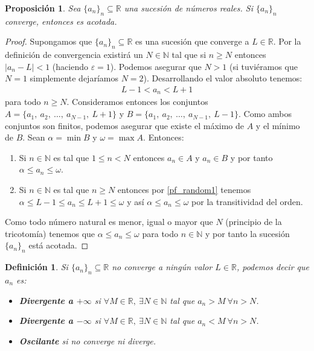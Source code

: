 \documentclass{article}
\newtheorem{prop}{Proposición}
\newtheorem{define}{Definición}
\newcommand{\reales}{\mathbb{R}}
\newcommand{\naturales}{\mathbb{N}}
\newcommand{\sucesion}[1]{\{ #1 _n \}_n}
\newcommand{\sucreal}[1]{\{ #1 _n \}_n \subseteq \reales}
\begin{document}
\begin{prop}
	Sea $\{ a_n\}_n \subseteq \mathbb{R}$ una sucesión de números reales. Si $\{ a_n\}_n$ converge, entonces es acotada.
\end{prop}

\begin{proof}
	Supongamos que $\sucreal{a}$ es una sucesión que converge a $L \in \reales$. Por la definición de convergencia existirá un $N \in \naturales$ tal que si $n \geq N$ entonces $|a_n - L| < 1$ (haciendo $\varepsilon = 1$). Podemos asegurar que $N > 1$ (si tuviéramos que $N = 1$ simplemente dejaríamos $N = 2$). Desarrollando el valor absoluto tenemos:
	\begin{align}\label{pf_random1}
		L - 1 < a_n < L + 1
	\end{align}	
	para todo $n \geq N$. Consideramos entonces los conjuntos $A = \{ a_1,\ a_2,\ \ldots,\ a_{N-1},\  L+1\}$ y $B = \{ a_1,\ a_2,\ \ldots,\ a_{N-1},\ L-1\}$. Como ambos conjuntos son finitos, podemos asegurar que existe el máximo de $A$ y el mínimo de $B$. Sean $\alpha = \min B$ y $\omega = \max A$. Entonces:
	\begin{enumerate}
	\item
	Si $n \in \naturales$ es tal que $1 \leq n < N$ entonces $a_n \in A$ y $a_n \in B$ y por tanto $\alpha \leq a_n \leq \omega$.
	\item
	Si $n \in \naturales$ es tal que $n \geq N$ entonces por \eqref{pf_random1} tenemos $\alpha \leq L - 1 \leq a_n \leq L + 1 \leq \omega$ y así $\alpha \leq a_n \leq \omega$ por la transitividad del orden.
	\end{enumerate}	 
	Como todo número natural es menor, igual o mayor que $N$ (principio de la tricotomía) tenemos que $\alpha \leq a_n \leq \omega$ para todo $n \in \naturales$ y por tanto la sucesión $\sucesion{a}$ está acotada.
\end{proof}

\begin{define}
	Si $\{ a_n\}_n \subseteq \mathbb{R}$ no converge a ningún valor $L\in\mathbb{R}$, podemos decir que $a_n$ es:
	\begin{itemize}
		\item
		\textbf{Divergente a $+\infty$} si $\forall M \in \mathbb{R},\ \exists N \in \mathbb{N}$ tal que $a_n > M\ \forall n>N$.
		
		\item
		\textbf{Divergente a $-\infty$} si $\forall M \in \mathbb{R},\ \exists N \in \mathbb{N}$ tal que $a_n < M\ \forall n>N$.
		
		\item
		\textbf{Oscilante} si no converge ni diverge.
	\end{itemize}
\end{define}
\end{document}
